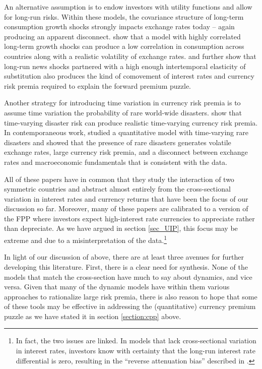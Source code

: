 \documentclass{ar-1col}
\begin{document}
An alternative assumption is to endow investors with \cite{EpsteinZin1989} utility functions and allow for long-run risks. Within these models, the covariance structure of long-term consumption growth shocks strongly impacts exchange rates today -- again producing an apparent disconnect. \citet{ColacitoCroce2011} show that a model with highly correlated long-term growth shocks can produce a low correlation in consumption across countries along with a realistic volatility of exchange rates. \citet{BansalShaliastovich2012} and \citet{ColacitoCroce2013} further show that long-run news shocks partnered with a high enough intertemporal elasticity of substitution also produces the kind of comovement of interest rates and currency risk premia required to explain the forward premium puzzle. 

Another strategy for introducing time variation in currency risk premia is to assume time variation the probability of rare world-wide disasters. \citet{FarhiGabaix2016} show that time-varying disaster risk can produce realistic time-varying currency risk premia. In contemporaneous work, \citet{GourioSiemerVerdelhan2011} studied a quantitative model with time-varying rare disasters and showed that
the presence of rare disasters generates volatile exchange rates, large currency risk premia, and a disconnect between exchange rates and macroeconomic fundamentals that is consistent with the data.

All of these papers have in common that they study the interaction of two symmetric countries and abstract almost entirely from the cross-sectional variation in interest rates and currency returns that have been the focus of our discussion so far. Moreover, many of these papers are calibrated to a version of the FPP where investors expect high-interest rate currencies to appreciate rather than depreciate. As we have argued in section \ref{sec_UIP}, this focus may be extreme and due to a misinterpretation of the data.\footnote{In fact, the two issues are linked. In models that lack cross-sectional variation in interest rates, investors know with certainty that the long-run interest rate differential is zero, resulting in the ``reverse attenuation bias'' described in \cite{HassanMano2019}.} 

In light of our discussion of above, there are at least three avenues for further developing this literature. First, there is a clear need for synthesis. None of the models that match the cross-section have much to say about dynamics, and vice versa. Given that many of the dynamic models have within them various approaches to rationalize large risk premia, there is also reason to hope that some of these tools may be effective in addressing the (quantitative) currency premium puzzle as we have stated it in section \ref{section:cpp} above. 
\end{document}
